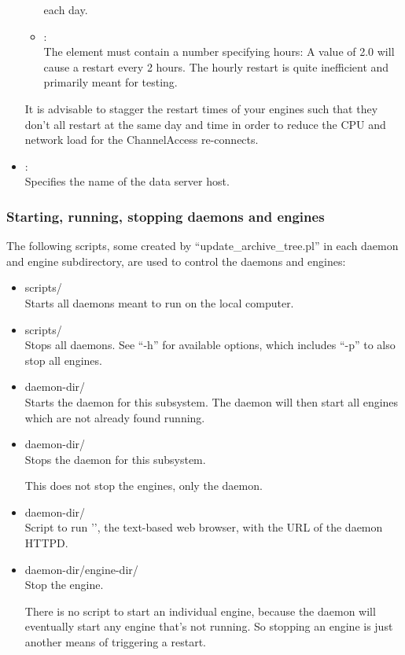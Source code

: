 \begin{itemize}
\begin{itemize}
         each day.
      \item {}:\\
         The element must contain a number specifying hours: A value
	 of 2.0 will cause a restart every 2 hours. The hourly restart
	 is quite inefficient and primarily meant for testing.
      \end{itemize}
      \NOTE It is advisable to stagger the restart times of your engines
      such that they don't all restart at the same day and time in order to
      reduce the CPU and network load for the ChannelAccess re-connects.
\item {}:\\
      Specifies the name of the data server host.
\end{itemize}



\subsubsection{Starting, running, stopping daemons and engines}
The following scripts, some created by ``update\_archive\_tree.pl'' in
each daemon and engine subdirectory, are used to control the daemons
and engines:
\begin{itemize}
\item scripts/ \\
      Starts all daemons meant to run on the local computer.
\item scripts/ \\
      Stops all daemons. See ``-h'' for available options, which
      includes ``-p'' to also stop all engines.
\item daemon-dir/ \\
      Starts the daemon for this subsystem.
      The daemon will then start all engines which are not already
      found running.
\item daemon-dir/ \\
      Stops the daemon for this subsystem.

      \NOTE This does not stop the engines, only the daemon.
\item daemon-dir/ \\
      Script to run '', the text-based web browser, with
      the URL of the daemon HTTPD.
\item daemon-dir/engine-dir/ \\
      Stop the engine.

      \NOTE There is no script to start an individual engine, because the
      daemon will eventually start any engine that's not running.
      So stopping an engine is just another means of triggering a
      restart.
\end{itemize}

